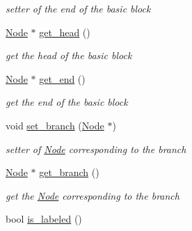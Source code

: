 \begin{DoxyCompactItemize}
\begin{DoxyCompactList}\small\item\em setter of the end of the basic block \item\end{DoxyCompactList}\item 
\hypertarget{classBasic__block_ac317495c3e84de7431562490dcedff9e}{
\hyperlink{classNode}{Node} $\ast$ \hyperlink{classBasic__block_ac317495c3e84de7431562490dcedff9e}{get\_\-head} ()}
\label{classBasic__block_ac317495c3e84de7431562490dcedff9e}

\begin{DoxyCompactList}\small\item\em get the head of the basic block \item\end{DoxyCompactList}\item 
\hypertarget{classBasic__block_ae914e0179d58835b213bad613bfbaf40}{
\hyperlink{classNode}{Node} $\ast$ \hyperlink{classBasic__block_ae914e0179d58835b213bad613bfbaf40}{get\_\-end} ()}
\label{classBasic__block_ae914e0179d58835b213bad613bfbaf40}

\begin{DoxyCompactList}\small\item\em get the end of the basic block \item\end{DoxyCompactList}\item 
\hypertarget{classBasic__block_a4930bdd8a990cfb2d10f39087306a75e}{
void \hyperlink{classBasic__block_a4930bdd8a990cfb2d10f39087306a75e}{set\_\-branch} (\hyperlink{classNode}{Node} $\ast$)}
\label{classBasic__block_a4930bdd8a990cfb2d10f39087306a75e}

\begin{DoxyCompactList}\small\item\em setter of \hyperlink{classNode}{Node} corresponding to the branch \item\end{DoxyCompactList}\item 
\hypertarget{classBasic__block_a5015a11dd64de82b6480a86ded7d720b}{
\hyperlink{classNode}{Node} $\ast$ \hyperlink{classBasic__block_a5015a11dd64de82b6480a86ded7d720b}{get\_\-branch} ()}
\label{classBasic__block_a5015a11dd64de82b6480a86ded7d720b}

\begin{DoxyCompactList}\small\item\em get the \hyperlink{classNode}{Node} corresponding to the branch \item\end{DoxyCompactList}\item 
\hypertarget{classBasic__block_a94840ac976b27d9024f4c04efb276ac1}{
bool \hyperlink{classBasic__block_a94840ac976b27d9024f4c04efb276ac1}{is\_\-labeled} ()}
\label{classBasic__block_a94840ac976b27d9024f4c04efb276ac1}


\end{DoxyCompactItemize}

